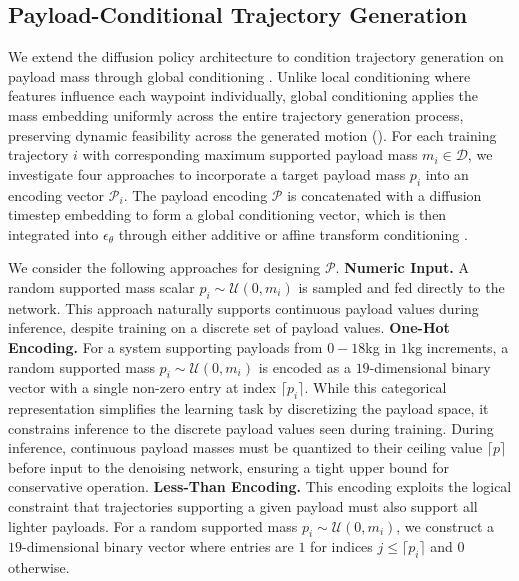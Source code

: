 \vspace{-0.12in}

\subsection{Payload-Conditional Trajectory Generation}\label{sec:model}
\vspace{-0.1in}

We extend the diffusion policy architecture to condition trajectory generation on payload mass through global conditioning \cite{chi2023diffusionpolicy}. Unlike local conditioning where features influence each waypoint individually, global conditioning applies the mass embedding uniformly across the entire trajectory generation process, preserving dynamic feasibility across the generated motion ().
For each training trajectory $i$ with corresponding maximum supported payload mass $m_i \in \mathcal{D}$, we investigate four approaches to incorporate a target payload mass $p_i$ into an encoding vector $\mathcal{P}_i$.
The payload encoding $\mathcal{P}$ is concatenated with a diffusion timestep embedding to form a global conditioning vector, which is then integrated into $\epsilon_\theta$ through either additive or affine transform conditioning \cite{perez2018film}.%

We consider the following approaches for designing $\mathcal{P}$.
\noindent\textbf{Numeric Input.} A random supported mass scalar $p_i \sim \mathcal{U}(0, m_i)$ is sampled and fed directly to the network. This approach naturally supports continuous payload values during inference, despite training on a discrete set of payload values.
\noindent\textbf{One-Hot Encoding.} For a system supporting payloads from $0-18$kg in $1$kg increments, a random supported mass $p_i \sim \mathcal{U}(0, m_i)$ is encoded as a $19$-dimensional binary vector with a single non-zero entry at index $\lceil p_i \rceil$.
While this categorical representation simplifies the learning task by discretizing the payload space, it constrains inference to the discrete payload values seen during training.
During inference, continuous payload masses must be quantized to their ceiling value $\lceil p \rceil$ before input to the denoising network, ensuring a tight upper bound for conservative operation.
\noindent\textbf{Less-Than Encoding.} This encoding exploits the logical constraint that trajectories supporting a given payload must also support all lighter payloads.
For a random supported mass $p_i \sim \mathcal{U}(0, m_i)$, we construct a $19$-dimensional binary vector where entries are $1$ for indices $j \leq \lceil p_i \rceil$ and $0$ otherwise.
